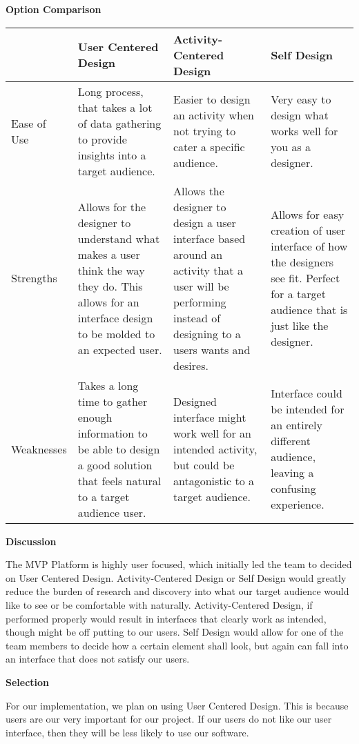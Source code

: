 \documentclass[letterpaper, 10pt, draftclsnofoot, compsoc, onecolumn]{IEEEtran}
\begin{document}
{\newpage
{\noindent\rmfamily\bfseries\color{black} Option Comparison \par}
\vspace{1pc}
\tablehead{}
\begin{supertabular}{|p{2cm}|p{4cm}|p{4cm}|p{4cm}|}
\hline  & User Centered Design & Activity-Centered Design & Self Design\\ \hline
Ease of Use & Long process, that takes a lot of data gathering to provide insights into a target audience. & Easier to design an activity when not trying to cater a specific audience. & Very easy to design what works well for you as a designer. \\ \hline
Strengths & Allows for the designer to understand what makes a user think the way they do. This allows for an interface design to be molded to an expected user. & Allows the designer to design a user interface based around an activity that a user will be performing instead of designing to a users wants and desires. & Allows for easy creation of user interface of how the designers see fit. Perfect for a target audience that is just like the designer. \\ \hline
Weaknesses & Takes a long time to gather enough information to be able to design a good solution that feels natural to a target audience user. & Designed interface might work well for an intended activity, but could be antagonistic to a target audience. & Interface could be intended for an entirely different audience, leaving a confusing experience.\\ \hline

\end{supertabular}

\newpage
{\noindent\rmfamily\bfseries\color{black} Discussion \par}
{\noindent The MVP Platform is highly user focused, which initially led the team to decided on User Centered Design. Activity-Centered Design or Self Design would greatly reduce the burden of research and discovery into what our target audience would like to see or be comfortable with naturally. Activity-Centered Design, if performed properly would result in interfaces that clearly work as intended, though might be off putting to our users. Self Design would allow for one of the team members to decide how a certain element shall look, but again can fall into an interface that does not satisfy our users.\par}

\medskip
{\noindent\rmfamily\bfseries\color{black} Selection \par}
{\noindent For our implementation, we plan on using User Centered Design. This is because users are our very important for our project. If our users do not like our user interface, then they will be less likely to use our software. \par}








}
\end{document}
